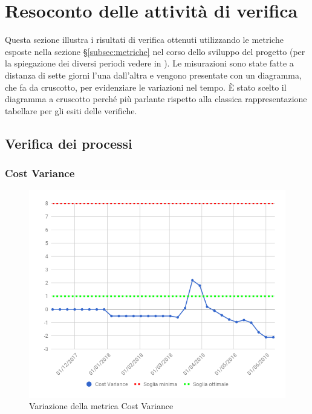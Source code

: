 \section{Resoconto delle attività di verifica} \label{res verifica}
	Questa sezione illustra i risultati di verifica ottenuti utilizzando 
	le metriche esposte nella sezione §\ref{subsec:metriche} nel corso
	dello sviluppo del progetto (per la spiegazione dei diversi periodi vedere 
	in \vPianoDiProgetto{}).
	Le misurazioni sono state fatte a distanza di sette giorni l'una dall'altra e
	vengono presentate con un diagramma, che fa da cruscotto,
	per evidenziare le variazioni nel tempo. È stato scelto il diagramma a cruscotto perché 
	più parlante rispetto alla classica rappresentazione tabellare per gli esiti delle verifiche.\\
	
	\subsection{Verifica dei processi}
		\subsubsection{Cost Variance}
	
		\begin{figure}[H]{\textwidth}
  			\centering
  			\includegraphics[width=1\linewidth]{./img/Risultati/CostVariance.png}
	  		\caption{Variazione della metrica Cost Variance}
		\end{figure}\\
		
